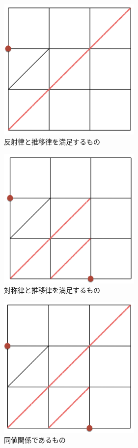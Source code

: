 \documentclass{jsarticle}
\begin{document}
\begin{figure}[htbp]
  \begin{center}
    \includegraphics[clip,width=7.0cm]{8_4/8_4_2.png}
    \caption{反射律と推移律を満足するもの}
    \label{fig:8.4.2}
  \end{center}
\end{figure}
\begin{figure}[htbp]
  \begin{center}
    \includegraphics[clip,width=7.0cm]{8_4/8_4_3.png}
    \caption{対称律と推移律を満足するもの}
    \label{fig:8.4.3}
  \end{center}
\end{figure}\begin{figure}[htbp]
  \begin{center}
    \includegraphics[clip,width=7.0cm]{8_4/8_4_4.png}
    \caption{同値関係であるもの}
    \label{fig:8.4.4}
  \end{center}
\end{figure}
\end{document}
